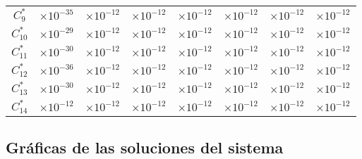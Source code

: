 \begin{center}
\begin{tabular}[h]{|c|r|r|r|r|r|r|r|}
    $C_9^*$ &  $\times 10^{-35}$& $\times 10^{-12}$ & $\times 10^{-12}$ & $\times 10^{-12}$ & $\times 10^{-12}$ & $\times 10^{-12}$ & $\times 10^{-12}$ \\
    $C_{10}^*$ & $\times 10^{-29}$& $\times 10^{-12}$ & $\times 10^{-12}$ & $\times 10^{-12}$ & $\times 10^{-12}$ & $\times 10^{-12}$ & $\times 10^{-12}$ \\
    $C_{11}^*$ & $\times 10^{-30}$& $\times 10^{-12}$ & $\times 10^{-12}$ & $\times 10^{-12}$ & $\times 10^{-12}$ & $\times 10^{-12}$ & $\times 10^{-12}$  \\
    $C_{12}^*$ & $\times 10^{-36}$& $\times 10^{-12}$ & $\times 10^{-12}$ & $\times 10^{-12}$ & $\times 10^{-12}$ & $\times 10^{-12}$ & $\times 10^{-12}$  \\
    $C_{13}^*$ & $\times 10^{-30}$& $\times 10^{-12}$ & $\times 10^{-12}$ & $\times 10^{-12}$ & $\times 10^{-12}$ & $\times 10^{-12}$ & $\times 10^{-12}$  \\
    $C_{14}^*$ & $\times 10^{-12}$& $\times 10^{-12}$ & $\times 10^{-12}$ & $\times 10^{-12}$ & $\times 10^{-12}$ & $\times 10^{-12}$ & $\times 10^{-12}$  \\
    \hline
\end{tabular}
\label{tabla_coeficientes_bateman2}
\end{center}
\subsection{Gráficas de las soluciones del sistema}